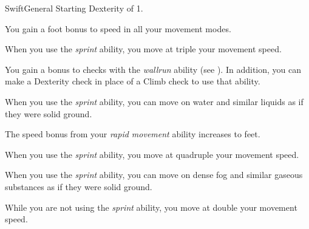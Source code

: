     \begin{feat}{Swift}{General}
        \featpre Starting Dexterity of 1.

         You gain a  foot bonus to speed in all your movement modes.

         When you use the \textit{sprint} ability, you move at triple your movement speed.

         You gain a  bonus to checks with the \textit{wallrun} ability (see ).
        In addition, you can make a Dexterity check in place of a Climb check to use that ability.

         When you use the \textit{sprint} ability, you can move on water and similar liquids as if they were solid ground.

         The speed bonus from your \textit{rapid movement} ability increases to  feet.

         When you use the \textit{sprint} ability, you move at quadruple your movement speed.

         When you use the \textit{sprint} ability, you can move on dense fog and similar gaseous substances as if they were solid ground.

         While you are not using the \textit{sprint} ability, you move at double your movement speed.
    \end{feat}

